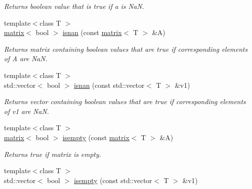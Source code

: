 \begin{DoxyCompactItemize}
\begin{DoxyCompactList}\small\item\em Returns boolean value that is true if a is Na\-N. \end{DoxyCompactList}\item 
\hypertarget{namespacekeycpp_ad3b16064066dc041be364e6fbefa173a}{{\footnotesize template$<$class T $>$ }\\\hyperlink{classkeycpp_1_1matrix}{matrix}$<$ bool $>$ \hyperlink{namespacekeycpp_ad3b16064066dc041be364e6fbefa173a}{isnan} (const \hyperlink{classkeycpp_1_1matrix}{matrix}$<$ T $>$ \&A)}\label{namespacekeycpp_ad3b16064066dc041be364e6fbefa173a}

\begin{DoxyCompactList}\small\item\em Returns matrix containing boolean values that are true if corresponding elements of A are Na\-N. \end{DoxyCompactList}\item 
\hypertarget{namespacekeycpp_a00160cff29da446de425d98ffafe8cb3}{{\footnotesize template$<$class T $>$ }\\std\-::vector$<$ bool $>$ \hyperlink{namespacekeycpp_a00160cff29da446de425d98ffafe8cb3}{isnan} (const std\-::vector$<$ T $>$ \&v1)}\label{namespacekeycpp_a00160cff29da446de425d98ffafe8cb3}

\begin{DoxyCompactList}\small\item\em Returns vector containing boolean values that are true if corresponding elements of v1 are Na\-N. \end{DoxyCompactList}\item 
\hypertarget{namespacekeycpp_acc2de8926c54a2048a0d8965e7d70995}{{\footnotesize template$<$class T $>$ }\\\hyperlink{classkeycpp_1_1matrix}{matrix}$<$ bool $>$ \hyperlink{namespacekeycpp_acc2de8926c54a2048a0d8965e7d70995}{isempty} (const \hyperlink{classkeycpp_1_1matrix}{matrix}$<$ T $>$ \&A)}\label{namespacekeycpp_acc2de8926c54a2048a0d8965e7d70995}

\begin{DoxyCompactList}\small\item\em Returns true if matrix is empty. \end{DoxyCompactList}\item 
\hypertarget{namespacekeycpp_a0bffe72cf3a118ccaaa6f195c4859550}{{\footnotesize template$<$class T $>$ }\\std\-::vector$<$ bool $>$ \hyperlink{namespacekeycpp_a0bffe72cf3a118ccaaa6f195c4859550}{isempty} (const std\-::vector$<$ T $>$ \&v1)}\label{namespacekeycpp_a0bffe72cf3a118ccaaa6f195c4859550}


\end{DoxyCompactItemize}
